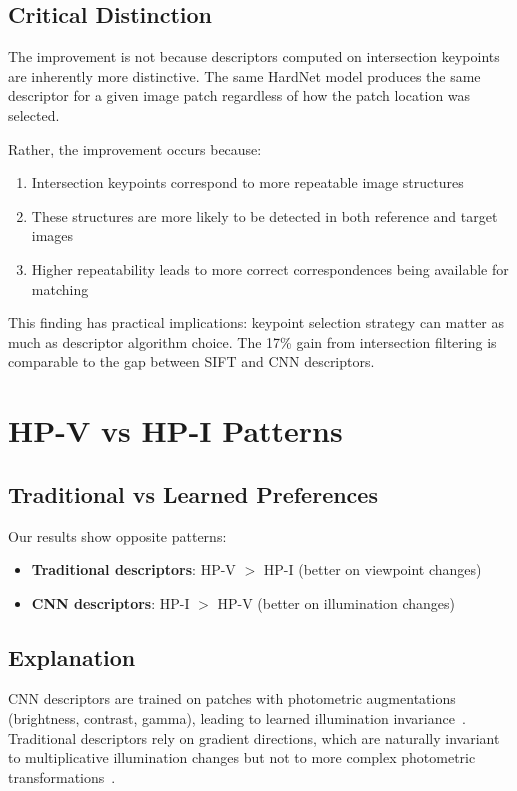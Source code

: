 \subsection{Critical Distinction}

The improvement is not because descriptors computed on intersection keypoints are inherently more distinctive. The same HardNet model produces the same descriptor for a given image patch regardless of how the patch location was selected.

Rather, the improvement occurs because:
\begin{enumerate}
    \item Intersection keypoints correspond to more repeatable image structures
    \item These structures are more likely to be detected in both reference and target images
    \item Higher repeatability leads to more correct correspondences being available for matching
\end{enumerate}

This finding has practical implications: keypoint selection strategy can matter as much as descriptor algorithm choice. The 17\% gain from intersection filtering is comparable to the gap between SIFT and CNN descriptors.

\section{HP-V vs HP-I Patterns}

\subsection{Traditional vs Learned Preferences}

Our results show opposite patterns:
\begin{itemize}
    \item \textbf{Traditional descriptors}: HP-V $>$ HP-I (better on viewpoint changes)
    \item \textbf{CNN descriptors}: HP-I $>$ HP-V (better on illumination changes)
\end{itemize}

\subsection{Explanation}

CNN descriptors are trained on patches with photometric augmentations (brightness, contrast, gamma), leading to learned illumination invariance~\cite{mishchuk2017working,tian2019sosnet}. Traditional descriptors rely on gradient directions, which are naturally invariant to multiplicative illumination changes but not to more complex photometric transformations~\cite{lowe2004distinctive}.

